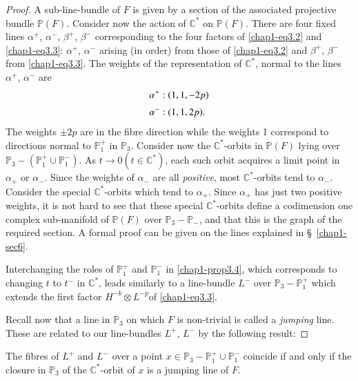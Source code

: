 \begin{proof}
A sub-line-bundle of $F$ is given by a section of the associated
projective bundle $\mathbb{P}(F)$. Consider now the action of
$\mathbb{C}^{*}$ on $\mathbb{P}(F)$. There are four fixed lines
$\alpha^{+}$, $\alpha^{-}$, $\beta^{+}$, $\beta^{-}$ corresponding to
the four factors of \eqref{chap1-eq3.2} and \eqref{chap1-eq3.3}:
$\alpha^{+}$, $\alpha^{-}$ arising (in order) from those of
\eqref{chap1-eq3.2} and $\beta^{+}$, $\beta^{-}$ from
\eqref{chap1-eq3.3}. The weights of the representation of
$\mathbb{C}^{*}$, normal to the lines $\alpha^{+}$, $\alpha^{-}$ are
\setcounter{equation}{4}
\begin{align}
& \alpha^{+}:(1,1,-2p)\notag\\[3pt]
& \alpha^{-}:(1,1,2p).\label{chap1-eq3.5}
\end{align}
The weights $\pm 2p$ are in the fibre direction while the weights 1
correspond to directions normal to $\mathbb{P}^{+}_{1}$ in
$\mathbb{P}_{3}$. Consider now the $\mathbb{C}^{*}$-orbits in
$\mathbb{P}(F)$ lying over $\mathbb{P}_3-(\mathbb{P}^{+}_{1}\cup
\mathbb{P}^{-}_{1})$. As $t\to 0(t\in\mathbb{C}^{*})$, each such orbit
acquires a limit point in $\alpha_{+}$ or $\alpha_{-}$. Since the
weights of $\alpha_{-}$ are all {\em positive}, most
$\mathbb{C}^{*}$-orbits tend to $\alpha_{-}$. Consider the special
$\mathbb{C}^{*}$-orbits which tend to $\alpha_{+}$. Since $\alpha_{+}$
has just two positive weights, it is not hard to see that these
special $\mathbb{C}^{*}$-orbits define a codimension one complex
sub-manifold of $\mathbb{P}(F)$ over $\mathbb{P}_{3}-\mathbb{P}_{-}$,
and that this is the graph of the required section. A formal proof can
be given on the lines explained in \S\ \ref{chap1-sec6}.

Interchanging the roles of $\mathbb{P}^{+}_{1}$ and
$\mathbb{P}^{-}_{1}$ in \ref{chap1-prop3.4}, which corresponds to
changing $t$ to $t^{-}$ in $\mathbb{C}^{*}$, leads similarly to a
line-bundle $L^{-}$ over $\mathbb{P}_{3}-\mathbb{P}^{+}_{1}$ which
extends the first factor $H^{-k}\otimes L^{-p}$\pageoriginale of
\eqref{chap1-eq3.3}. 

Recall now that a line in $\mathbb{P}_{3}$ on which $F$ is non-trivial
is called a {\em jumping} line. These are related to our line-bundles
$L^{+}$, $L^{-}$ by the following result:
\end{proof}

\begin{proposition}\label{chap1-prop3.5}
The fibres of $L^{+}$ and $L^{-}$ over a point
$x\in\mathbb{P}_{3}-\mathbb{P}^{+}_{1}\cup \mathbb{P}^{-}_{1}$
coincide if and only if the closure in $\mathbb{P}_{3}$ of the
$\mathbb{C}^{*}$-orbit of $x$ is a jumping line of $F$.
\end{proposition}

